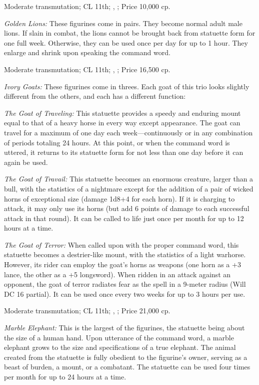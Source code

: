Moderate transmutation; CL 11th; , ; Price 10,000 cp.

\textit{Golden Lions:} These figurines come in pairs. They become normal adult male lions. If slain in combat, the lions cannot be brought back from statuette form for one full week. Otherwise, they can be used once per day for up to 1 hour. They enlarge and shrink upon speaking the command word.

Moderate transmutation; CL 11th; , ; Price 16,500 cp.

\textit{Ivory Goats:} These figurines come in threes. Each goat of this trio looks slightly different from the others, and each has a different function:

\begin{itemize*}
\item \emph{The Goat of Traveling:} This statuette provides a speedy and enduring mount equal to that of a heavy horse in every way except appearance. The goat can travel for a maximum of one day each week---continuously or in any combination of periods totaling 24 hours. At this point, or when the command word is uttered, it returns to its statuette form for not less than one day before it can again be used.
\item \emph{The Goat of Travail:} This statuette becomes an enormous creature, larger than a bull, with the statistics of a nightmare except for the addition of a pair of wicked horns of exceptional size (damage 1d8+4 for each horn). If it is charging to attack, it may only use its horns (but add 6 points of damage to each successful attack in that round). It can be called to life just once per month for up to 12 hours at a time.
\item \emph{The Goat of Terror:} When called upon with the proper command word, this statuette becomes a destrier-like mount, with the statistics of a light warhorse. However, its rider can employ the goat's horns as weapons (one horn as a +3 lance, the other as a +5 longsword). When ridden in an attack against an opponent, the goat of terror radiates fear as the spell in a 9-meter radius (Will DC 16 partial). It can be used once every two weeks for up to 3 hours per use.
\end{itemize*}

Moderate transmutation; CL 11th; , ; Price 21,000 cp.

\textit{Marble Elephant:} This is the largest of the figurines, the statuette being about the size of a human hand. Upon utterance of the command word, a marble elephant grows to the size and specifications of a true elephant. The animal created from the statuette is fully obedient to the figurine's owner, serving as a beast of burden, a mount, or a combatant. The statuette can be used four times per month for up to 24 hours at a time.

